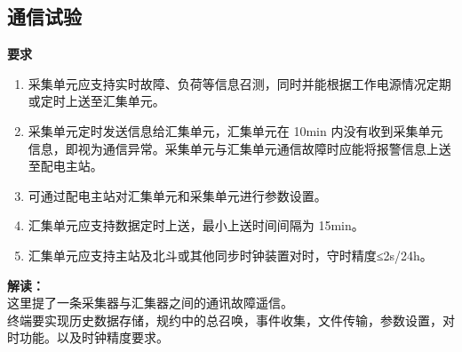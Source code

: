 \documentclass{article}
\begin{document}
\begin{CJK}{UTF8}{gbsn}
\subsection{ 通信试验 }
		\par
		\textbf{要求}
		\begin{enumerate}
		\item 采集单元应支持实时故障、负荷等信息召测，同时并能根据工作电源情况定期或定时上送至汇集单元。 
		\item 采集单元定时发送信息给汇集单元，汇集单元在 10min 内没有收到采集单元信息，即视为通信异常。采集单元与汇集单元通信故障时应能将报警信息上送至配电主站。 
		\item 可通过配电主站对汇集单元和采集单元进行参数设置。 
		\item 汇集单元应支持数据定时上送，最小上送时间间隔为 15min。 
		\item 汇集单元应支持主站及北斗或其他同步时钟装置对时，守时精度≤2s/24h。		
		\end{enumerate}
		\textbf{解读：}\\
		这里提了一条采集器与汇集器之间的通讯故障遥信。\\
		终端要实现历史数据存储，规约中的总召唤，事件收集，文件传输，参数设置，对时功能。以及时钟精度要求。

\end{CJK}
\end{document}

